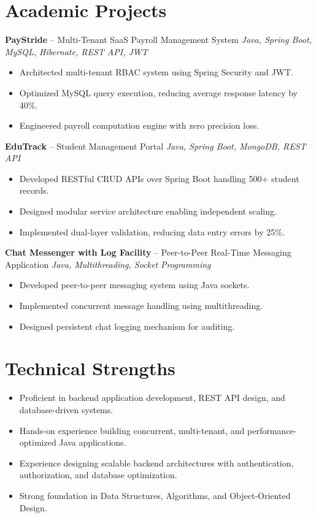 \documentclass[10.5pt,a4paper]{article}
\begin{document}
\section{Academic Projects}
\textbf{PayStride} -- Multi-Tenant SaaS Payroll Management System \hfill \textit{Java, Spring Boot, MySQL, Hibernate, REST API, JWT}
\begin{itemize}
  \item Architected multi-tenant RBAC system using Spring Security and JWT.
  \item Optimized MySQL query execution, reducing average response latency by 40\%.
  \item Engineered payroll computation engine with zero precision loss.
\end{itemize}
\vspace{4pt}
\textbf{EduTrack} -- Student Management Portal \hfill \textit{Java, Spring Boot, MongoDB, REST API}
\begin{itemize}
  \item Developed RESTful CRUD APIs over Spring Boot handling 500+ student records.
  \item Designed modular service architecture enabling independent scaling.
  \item Implemented dual-layer validation, reducing data entry errors by 25\%.
\end{itemize}
\vspace{4pt}
\textbf{Chat Messenger with Log Facility} -- Peer-to-Peer Real-Time Messaging Application \hfill \textit{Java, Multithreading, Socket Programming}
\begin{itemize}
  \item Developed peer-to-peer messaging system using Java sockets.
  \item Implemented concurrent message handling using multithreading.
  \item Designed persistent chat logging mechanism for auditing.
\end{itemize}
\section{Technical Strengths}
\begin{itemize}
  \item Proficient in backend application development, REST API design, and database-driven systems.
  \item Hands-on experience building concurrent, multi-tenant, and performance-optimized Java applications.
  \item Experience designing scalable backend architectures with authentication, authorization, and database optimization.
  \item Strong foundation in Data Structures, Algorithms, and Object-Oriented Design.
\end{itemize}
\end{document}
